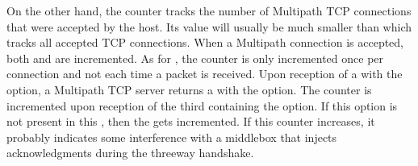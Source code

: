 \documentclass[letterpaper,10pt,english]{sphinxmanual}
\begin{document}
\sphinxAtStartPar
On the other hand, the  counter tracks the
number of Multipath TCP connections that were accepted by the host.
Its value will usually be much smaller than  which
tracks all accepted TCP connections. When a Multipath connection is accepted,
both  and  are incremented.
As for , the  counter is
only incremented once per connection and not each time a packet is received.
Upon reception of a  with the  option, a
Multipath TCP server returns a  with the 
option. The  counter is incremented upon reception
of the third  containing the  option. If this option
is not present in this , then the 
gets incremented.
If this counter increases, it probably indicates some interference with a
middlebox that injects acknowledgments during the three\sphinxhyphen{}way handshake.
\def\sphinxLiteralBlockLabel{\label{\detokenize{mptcp-linux:id14}}}
\begin{sphinxVerbatim}[commandchars=\\\{\}]
\end{sphinxVerbatim}
\def\sphinxLiteralBlockLabel{\label{\detokenize{mptcp-linux:id15}}}
\end{document}
